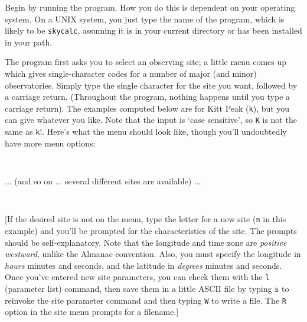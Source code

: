 Begin by running the program.  How you do this is dependent
on your operating system.  On a UNIX system, you just
type the name of the program, which is likely to be 
{\tt skycalc}, assuming it is in your current directory or
has been installed in your path.
\par
The program first asks you to select an observing 
site; a little menu comes up which gives single-character
codes for a number of major (and minor) observatories.
Simply type the single character for the site you want, followed
by a carriage return.  (Throughout the program, nothing happens
until you type a carriage return).  The examples computed below
are for Kitt Peak ({\tt k}), but you can give whatever you like.
Note that the input
is `case sensitive', so {\tt K} is not the same as {\tt k}!.  
Here's what the menu should look like, though you'll 
undoubtedly have more menu options:
\par

{\tt\obeyspaces
\line{\hfil }
\line{\hfil }
}	

\par

... (and so on ... several different sites are available) ...
\medskip\par
{\tt\obeyspaces
{}
}

\par

[If the desired site is not on the menu, type the letter
for a new site ({\tt n} in this example) and you'll be prompted for the
characteristics of the site.  The prompts should be
self-explanatory.  Note that the longitude and time zone are
{\sl positive westward}, unlike the Almanac convention.  Also, you
must specify the longitude in {\sl hours} minutes and seconds, 
and the latitude in {\sl degrees} minutes and seconds.
Once you've entered new site parameters, you can check them with the
{\tt l} (parameter list) command, then save them in a
little ASCII file by typing {\tt s} to reinvoke the site parameter command
and then typing {\tt W} to write a file.
The {\tt R} option in the site menu prompts for a filename.]
\par

